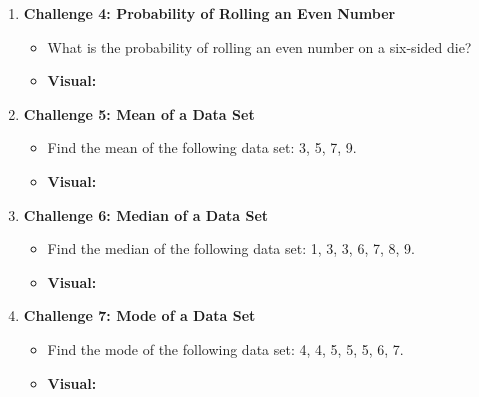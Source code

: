 \begin{enumerate}
    \item \textbf{Challenge 4: Probability of Rolling an Even Number}
    \begin{itemize}
        \item What is the probability of rolling an even number on a six-sided die?
        \item \textbf{Visual:}
        \begin{center}
        \end{center}
    \end{itemize}

    \item \textbf{Challenge 5: Mean of a Data Set}
    \begin{itemize}
        \item Find the mean of the following data set: 3, 5, 7, 9.
        \item \textbf{Visual:}
        \begin{center}
        \end{center}
    \end{itemize}

    \item \textbf{Challenge 6: Median of a Data Set}
    \begin{itemize}
        \item Find the median of the following data set: 1, 3, 3, 6, 7, 8, 9.
        \item \textbf{Visual:}
        \begin{center}
        \end{center}
    \end{itemize}

    \item \textbf{Challenge 7: Mode of a Data Set}
    \begin{itemize}
        \item Find the mode of the following data set: 4, 4, 5, 5, 5, 6, 7.
        \item \textbf{Visual:}
        \begin{center}
        \end{center}
    \end{itemize}


\end{enumerate}

